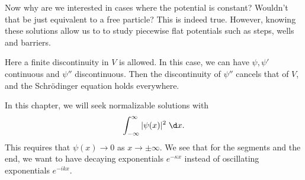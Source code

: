 \documentclass[a4paper]{article}
\begin{document}
Now why are we interested in cases where the potential is constant? Wouldn't that be just equivalent to a free particle? This is indeed true. However, knowing these solutions allow us to to study piecewise flat potentials such as steps, wells and barriers.
\begin{center}
\end{center}
Here a finite discontinuity in $V$ is allowed. In this case, we can have $\psi, \psi'$ continuous and $\psi''$ discontinuous. Then the discontinuity of $\psi''$ cancels that of $V$, and the Schr\"odinger equation holds everywhere.

In this chapter, we will seek normalizable solutions with
\[
  \int_{-\infty}^\infty |\psi(x)|^2 \;\d x.
\]
This requires that $\psi(x) \to 0$ as $x \to \pm\infty$. We see that for the segments and the end, we want to have decaying exponentials $e^{-\kappa x}$ instead of oscillating exponentials $e^{-ikx}$.
\end{document}

